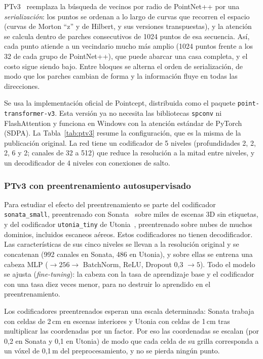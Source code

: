 \documentclass[5p]{elsarticle}
\begin{document}
PTv3~\cite{Wu2024} reemplaza la búsqueda de vecinos por radio de PointNet++ por una \emph{serialización}: los puntos se ordenan a lo largo de curvas que recorren el espacio (curvas de Morton ``z'' y de Hilbert, y sus versiones transpuestas), y la atención se calcula dentro de parches consecutivos de 1024 puntos de esa secuencia. Así, cada punto atiende a un vecindario mucho más amplio (1024 puntos frente a los 32 de cada grupo de PointNet++), que puede abarcar una casa completa, y el costo sigue siendo bajo. Entre bloques se alterna el orden de serialización, de modo que los parches cambian de forma y la información fluye en todas las direcciones.

Se usa la implementación oficial de Pointcept, distribuida como el paquete \texttt{point-transformer-v3}. Esta versión ya no necesita las bibliotecas \texttt{spconv} ni FlashAttention y funciona en Windows con la atención estándar de PyTorch (SDPA). La Tabla~\ref{tab:ptv3} resume la configuración, que es la misma de la publicación original. La red tiene un codificador de 5 niveles (profundidades 2, 2, 2, 6 y 2; canales de 32 a 512) que reduce la resolución a la mitad entre niveles, y un decodificador de 4 niveles con conexiones de salto.

\subsubsection{PTv3 con preentrenamiento autosupervisado}

Para estudiar el efecto del preentrenamiento se parte del codificador \texttt{sonata\_small}, preentrenado con Sonata~\cite{Wu2025} sobre miles de escenas 3D sin etiquetas, y del codificador \texttt{utonia\_tiny} de Utonia~\cite{Zhang2026}, preentrenado sobre nubes de muchos dominios, incluidos escaneos aéreos. Estos codificadores no tienen decodificador. Las características de sus cinco niveles se llevan a la resolución original y se concatenan (992 canales en Sonata, 486 en Utonia), y sobre ellas se entrena una cabeza MLP ($\to256\to$ BatchNorm, ReLU, Dropout 0,3 $\to5$). Todo el modelo se ajusta (\emph{fine-tuning}): la cabeza con la tasa de aprendizaje base y el codificador con una tasa diez veces menor, para no destruir lo aprendido en el preentrenamiento.

Los codificadores preentrenados esperan una escala determinada: Sonata trabaja con celdas de 2\,cm en escenas interiores y Utonia con celdas de 1\,cm tras multiplicar las coordenadas por un factor. Por eso las coordenadas se escalan (por 0,2 en Sonata y 0,1 en Utonia) de modo que cada celda de su grilla corresponda a un vóxel de 0,1\,m del preprocesamiento, y no se pierda ningún punto.
\end{document}
